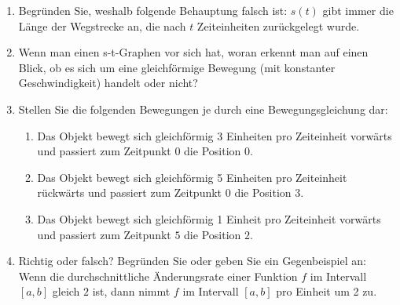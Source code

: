 \begin{enumerate}
\begin{tikzpicture}[scale=0.58]
          \end{tikzpicture}
          \begin{enumerate}[label=(\roman*)]
              \item bewegt sich nicht
              \item bewegt sich schnell und mit konstanter Geschwindigkeit vorwärts. \item bewegt sich beschleunigt vorwärts.
              \item bewegt sich mit konstanter Geschwindigkeit rückwärts.
              \item bewegt sich langsam und mit konstanter Geschwindigkeit vorwärts. \item fährt gleichförmig vorwärts, kehrt um und fährt dann gleichförmig rückwärts.
              \item bewegt sich langsamer werdend vorwärts.
              \item nähert sich rückwärtsfahrend sehr schnell dem Ort 0 und bremst dann stark ab.
          \end{enumerate}
    \item Begründen Sie, weshalb folgende Behauptung falsch ist: \glqq $s(t)$ gibt immer die Länge der Wegstrecke an, die nach $t$ Zeiteinheiten zurückgelegt wurde.\grqq
    \item Wenn man einen s-t-Graphen vor sich hat, woran erkennt man auf einen Blick, ob es sich um eine gleichförmige Bewegung (mit konstanter Geschwindigkeit) handelt oder nicht?
    \item Stellen Sie die folgenden Bewegungen je durch eine Bewegungsgleichung dar:
          \begin{enumerate}
              \item Das Objekt bewegt sich gleichförmig 3 Einheiten pro Zeiteinheit vorwärts und passiert zum Zeitpunkt $0$ die Position $0$.
              \item Das Objekt bewegt sich gleichförmig 5 Einheiten pro Zeiteinheit rückwärts und passiert zum Zeitpunkt $0$ die Position $3$.
              \item Das Objekt bewegt sich gleichförmig 1 Einheit pro Zeiteinheit vorwärts und passiert zum Zeitpunkt $5$ die Position $2$.
          \end{enumerate}
    \item Richtig oder falsch? Begründen Sie oder geben Sie ein Gegenbeispiel an: \glqq Wenn die durchschnittliche Änderungsrate einer Funktion $f$ im Intervall $[a,b]$ gleich $2$ ist, dann nimmt $f$ im Intervall $[a,b]$ pro Einheit um 2 zu.\grqq

\end{enumerate}
